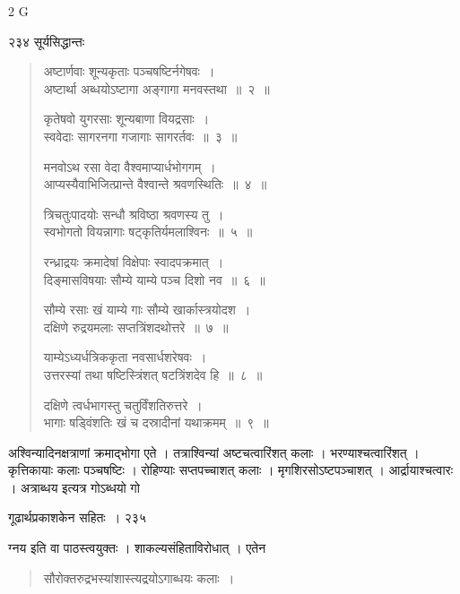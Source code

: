 \documentclass[11pt, openany]{book}
\begin{document}
{\tiny{2 G}}

\newpage

\noindent २३४ \hspace{4cm} सूर्यसिद्धान्तः 

 \begin{quote}
 {\ssi अष्टार्णवाः शून्यकृताः पञ्चषष्टिर्नगेषवः~।\\
अष्टार्था अब्धयोऽष्टागा अङ्गागा मनवस्तथा~॥~२~॥

कृतेषवो युगरसाः शून्यबाणा वियद्रसाः~।\\
स्ववेदाः सागरनगा गजागाः सागरर्तवः~॥~३~॥

मनवोऽथ रसा वेदा वैश्वमाप्यार्धभोगगम्~।\\
आप्यस्यैवाभिजित्प्रान्ते वैश्वान्ते श्रवणस्थितिः~॥~४~॥

त्रिचतुःपादयोः सन्धौ श्रविष्ठा श्रवणस्य तु~।\\
स्वभोगतो वियन्नागाः षट्कृतिर्यमलाश्विनः~॥~५~॥

रन्ध्राद्रयः क्रमादेषां विक्षेपाः स्वादपक्रमात्~।\\
दिङ्मासविषयाः सौम्ये याम्ये पञ्च दिशो नव~॥~६~॥

सौम्ये रसाः खं याम्ये गाः सौम्ये खार्कास्त्रयोदश~।\\
दक्षिणे रुद्रयमलाः सप्तत्रिंशदथोत्तरे~॥~७~॥

याम्येऽध्यर्धत्रिककृता नवसार्धशरेषवः~।\\
उत्तरस्यां तथा षष्टिस्त्रिंशत् षटत्रिंशदेव हि~॥~८~॥

दक्षिणे त्वर्धभागस्तु चतुर्विंशतिरुत्तरे~।\\
भागाः षड्विंशतिः खं च दस्रादीनां यथाक्रमम्~॥~९~॥ }
\end{quote}

 अश्विन्यादिनक्षत्राणां क्रमाद्भोगा एते । तत्राश्विन्यां अष्टचत्वारिंशत् कलाः । भरण्याश्चत्वारिंशत् । कृत्तिकायाः कलाः पञ्चषष्टिः । रोहिण्याः सप्तपच्चाशत् कलाः । मृगशिरसोऽष्टपञ्चाशत् । आर्द्रायाश्चत्वारः । अत्राब्धय इत्यत्र गोऽब्धयो गो \textendash


\newpage

\hspace{3cm} गूढार्थप्रकाशकेन सहितः~। \hfill २३५
\vspace{1cm}

\noindent ग्नय इति वा पाठस्त्वयुक्तः । शाकल्यसंहिताविरोधात् । एतेन

\begin{quote}
{\qt सौरोक्तरुद्रभस्यांशास्त्यद्रयोऽगाब्धयः कलाः~।}\\
\end{quote}
\end{document}
